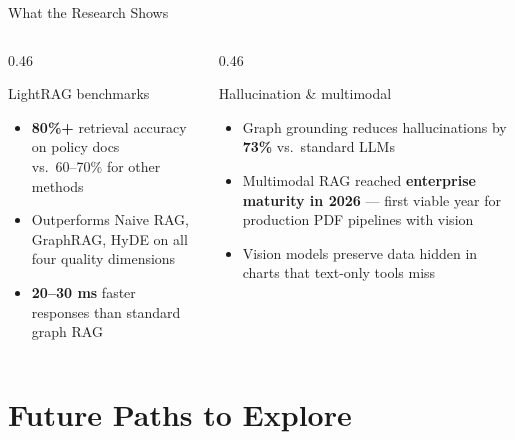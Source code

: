 \documentclass[aspectratio=169,11pt]{beamer}
\begin{document}
\begin{frame}{What the Research Shows}
  \vspace{0.3cm}
  \begin{columns}[t]
    \begin{column}{0.46\textwidth}
      \begin{block}{LightRAG benchmarks}
        \begin{itemize}\setlength\itemsep{7pt}
          \item \textbf{80\%+} retrieval accuracy on policy docs\\
                vs.\ 60--70\% for other methods
          \item Outperforms Naive RAG, GraphRAG, HyDE
                on all four quality dimensions
          \item \textbf{20--30 ms} faster responses than
                standard graph RAG
        \end{itemize}
      \end{block}
    \end{column}
    \begin{column}{0.46\textwidth}
      \begin{block}{Hallucination \& multimodal}
        \begin{itemize}\setlength\itemsep{7pt}
          \item Graph grounding reduces hallucinations
                by \textbf{73\%} vs.\ standard LLMs
          \item Multimodal RAG reached \textbf{enterprise
                maturity in 2026} — first viable year for
                production PDF pipelines with vision
          \item Vision models preserve data hidden in
                charts that text-only tools miss
        \end{itemize}
      \end{block}
    \end{column}
  \end{columns}
\end{frame}

\section{Future Paths to Explore}
\end{document}
